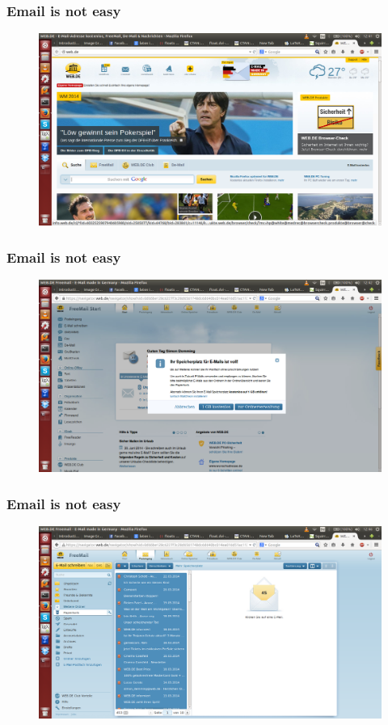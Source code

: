 \documentclass[9pt]{beamer}
\begin{document}
		\begin{frame}
			\frametitle{Email is not easy}
			\begin{figure}
				\centering
				\includegraphics[scale=0.2]{Images/webstart.png}
			\end{figure}
		\end{frame}
		
		\begin{frame}
			\frametitle{Email is not easy}
			\begin{figure}
				\centering
				\includegraphics[scale=0.2]{Images/webstartmail.png}
			\end{figure}
		\end{frame}
		
		\begin{frame}
			\frametitle{Email is not easy}
			\begin{figure}
				\centering
				\includegraphics[scale=0.2]{Images/deletemailserror.png}
			\end{figure}
		\end{frame}
		
\end{document}
